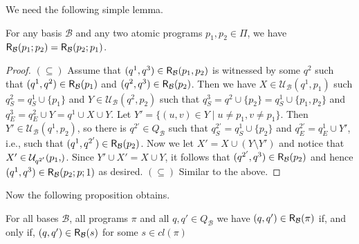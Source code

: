 \documentclass{llncs}
\newcommand{\cl}{cl}
\newcommand{\carriers}[1]{Q_{#1}}
\newcommand{\rels}[1]{{\sf R_{#1}}}
\newcommand{\update}[3]{{\mathcal U}_{#1}(#2,#3)}
\newcommand{\views}{\mathcal B}
\begin{document}
We need the following simple lemma.

\begin{lemma}\label{lemma:program}
For any basis $\views$ and any two atomic programs $p_1,p_2 \in \Pi$, we have $\rels \views (p_1;p_2) = \rels \views(p_2;p_1)$.
\end{lemma}

\begin{proof}
$(\subseteq)$ Assume that $(q^1,q^3) \in \rels \views(p_1,p_2)$ is witnessed by some $q^2$ such that $(q^1,q^2) \in \rels \views(p_1)$ and $(q^2,q^3) \in \rels \views(p_2)$. Then we have $X \in \update \views {q^1} {p_1}$ such $q^2_S = q^1_S \cup \{p_1\}$ and $Y \in \update \views {q^2} {p_2}$ such that $q^3_S = q^2 \cup \{p_2\} = q^1_S \cup \{p_1,p_2\}$ and $q^3_E = q^2_E \cup Y = q^1 \cup X \cup Y$. Let $Y' = \{(u,v) \in Y \mid u \not = p_1, v \not = p_1\}$. Then $Y' \in \update \views {q^1} {p_2}$, so there is $q^{2'} \in \carriers \views$ such that $q^{2'}_S = q^1_S \cup \{p_2\}$ and $q^{2'}_E = q^1_E \cup Y'$, i.e., such that $(q^1,q^{2'}) \in \rels \views(p_2)$. Now we let $X' = X \cup (Y \setminus Y')$ and notice that $X' \in \update {q^{2'}} {p_1}$. Since $Y' \cup X' = X \cup Y$, it follows that $(q^{2'},q^3) \in \rels \views(p_2)$ and hence $(q^1,q^3) \in \rels \views(p_2;p;1)$ as desired.
$(\subseteq)$ Similar to the above.
\end{proof}


Now the following proposition obtains.

\begin{proposition}\label{prop:prog}
For all bases $\views$, all programs $\pi$ and all $q,q' \in \carriers \views$ we have $(q,q') \in \rels \views(\pi)$ if, and only if, $(q,q') \in \rels \views(s)$ for some $s \in \cl(\pi)$
\end{proposition}
\end{document}
